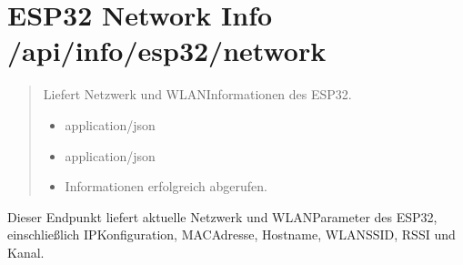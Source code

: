 \documentclass[letterpaper,10pt,english]{sphinxmanual}
\begin{document}
\section{ESP32 Network Info \textendash{} /api/info/esp32/network}
\label{\detokenize{agv_rest_api_info:esp32-network-info-api-info-esp32-network}}\label{\detokenize{agv_rest_api_info:get-api-info-esp32-network}}

\begin{fulllineitems}
\label{\detokenize{agv_rest_api_info:get--api-info-esp32-network}}
\pysigstartsignatures
\pysigline
{}
\pysigstopsignatures\begin{quote}\begin{description}
\sphinxAtStartPar
Liefert Netzwerk\sphinxhyphen{} und WLAN\sphinxhyphen{}Informationen des ESP32.

\begin{itemize}
\item {} 
\sphinxAtStartPar
{} \textendash{} application/json

\end{itemize}

\begin{itemize}
\item {} 
\sphinxAtStartPar
{} \textendash{} application/json

\end{itemize}

\begin{itemize}
\item {} 
\sphinxAtStartPar
{} \textendash{} Informationen erfolgreich abgerufen.

\end{itemize}

\end{description}\end{quote}

\end{fulllineitems}


\sphinxAtStartPar
{}
Dieser Endpunkt liefert aktuelle Netzwerk\sphinxhyphen{} und WLAN\sphinxhyphen{}Parameter des ESP32,
einschließlich IP\sphinxhyphen{}Konfiguration, MAC\sphinxhyphen{}Adresse, Hostname, WLAN\sphinxhyphen{}SSID, RSSI und Kanal.
\end{document}
